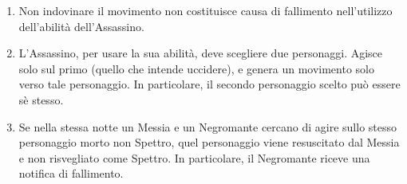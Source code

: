 \documentclass[a4paper,10pt]{article}
\begin{document}
\begin{enumerate}
	
	\item Non indovinare il movimento non costituisce causa di fallimento nell'utilizzo dell'abilità dell'Assassino.

	\item L'Assassino, per usare la sua abilità, deve scegliere due personaggi. Agisce solo sul primo (quello che intende uccidere), e genera un movimento solo verso tale personaggio. In particolare, il secondo personaggio scelto può essere sè stesso.
	
	
	
	\item Se nella stessa notte un Messia e un Negromante cercano di agire sullo stesso personaggio morto non Spettro, quel personaggio viene resuscitato dal Messia e non risvegliato come Spettro. In particolare, il Negromante riceve una notifica di fallimento.
	

\end{enumerate}
\end{document}
